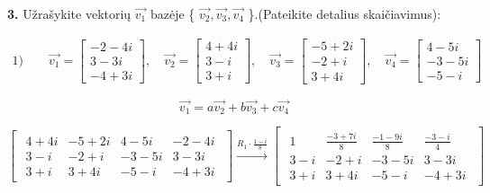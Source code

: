 \documentclass{article}
\begin{document}
\textbf{3.} Užrašykite vektorių  \(\overrightarrow{v_1}\)  bazėje \{ \(\overrightarrow{v_2},\overrightarrow{v_3},\overrightarrow{v_4}\) \}.(Pateikite detalius skaičiavimus):

\begin{align}
\text{1)}\qquad
\overrightarrow{v_1}=
\begin{bmatrix}
-2-4i\\
3-3i\\
-4+3i
\end{bmatrix}, \quad
\overrightarrow{v_2}=
\begin{bmatrix}
4+4i\\
3-i\\
3+i
\end{bmatrix}, \quad
\overrightarrow{v_3}=
\begin{bmatrix}
-5+2i\\
-2+i\\
3+4i
\end{bmatrix}, \quad
\overrightarrow{v_4}=
\begin{bmatrix}
4-5i \\
-3-5i \\
-5-i
\end{bmatrix} \nonumber
\end{align}

\begin{equation}
\overrightarrow{v_1}=a\overrightarrow{v_2} + b\overrightarrow{v_3} + c\overrightarrow{v_4}\nonumber
\end{equation}

\begin{equation}
\begin{bmatrix}
\begin{array}{ccc|c}
4+4i & -5+2i & 4-5i & -2-4i\\ 
3-i & -2+i & -3-5i & 3-3i\\
3+i & 3+4i & -5-i & -4+3i\nonumber
\end{array}
\end{bmatrix}
\xrightarrow{R_1\cdot\frac{1-i}{8}}
\begin{bmatrix}
\begin{array}{ccc|c}
1 & \frac{-3+7i}{8} & \frac{-1-9i}{8} & \frac{-3-i}{4}\\ 
3-i & -2+i & -3-5i & 3-3i\\
3+i & 3+4i & -5-i & -4+3i\nonumber
\end{array}
\end{bmatrix}
\end{equation}
\end{document}
